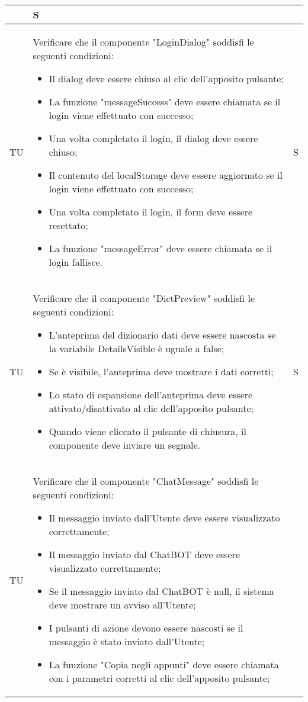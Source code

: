 \begin{adjustwidth}{-0.5cm}{-0.5cm}
\begin{longtable}{|P{1.5cm}|>{\raggedright}P{9.5cm}|>{\arraybackslash}P{1.5cm}|}
\begin{itemize}
    \end{itemize} & S \\
		\hline TU & Verificare che il componente "LoginDialog" soddisfi le seguenti condizioni:
    \begin{itemize}
      \item Il dialog deve essere chiuso al clic dell'apposito pulsante;
			\item La funzione "messageSuccess" deve essere chiamata se il login viene effettuato con successo;
			\item Una volta completato il login, il dialog deve essere chiuso;
			\item Il contenuto del localStorage deve essere aggiornato se il login viene effettuato con successo;
			\item Una volta completato il login, il form deve essere resettato;
			\item La funzione "messageError" deve essere chiamata se il login fallisce.
    \end{itemize} & S \\
		\hline TU & Verificare che il componente "DictPreview" soddisfi le seguenti condizioni:
    \begin{itemize}
      \item L'anteprima del dizionario dati deve essere nascosta se la variabile DetailsVisible è uguale a false;
			\item Se è visibile, l'anteprima deve mostrare i dati corretti;
			\item Lo stato di espansione dell'anteprima deve essere attivato/disattivato al clic dell'apposito pulsante;
			\item Quando viene cliccato il pulsante di chiusura, il componente deve inviare un segnale.
    \end{itemize} & S \\
		\hline TU & Verificare che il componente "ChatMessage" soddisfi le seguenti condizioni:
    \begin{itemize}
      \item Il messaggio inviato dall'Utente deve essere visualizzato correttamente;
			\item Il messaggio inviato dal ChatBOT deve essere visualizzato correttamente;
			\item Se il messaggio inviato dal ChatBOT è null, il sistema deve mostrare un avviso all'Utente;
			\item I pulsanti di azione devono essere nascosti se il messaggio è stato inviato dall'Utente;
			\item La funzione "Copia negli appunti" deve essere chiamata con i parametri corretti al clic dell'apposito pulsante;

\end{itemize}
\end{longtable}
\end{adjustwidth}
